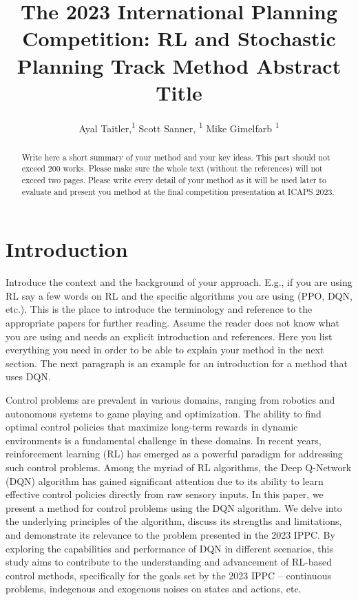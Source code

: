 \documentclass[letterpaper]{article} %
\title{The 2023 International Planning Competition: RL and Stochastic Planning Track Method Abstract Title}
\author {
    Ayal Taitler,\textsuperscript{\rm 1}
    Scott Sanner, \textsuperscript{\rm 1}
    Mike Gimelfarb \textsuperscript{\rm 1}
}
\begin{document}
\maketitle

\begin{abstract}
Write here a short summary of your method and your key ideas. This part should not exceed 200 works. Please make sure the whole text (without the references) will not exceed two pages. Please write every detail of your method as it will be used later to evaluate and present you method at the final competition presentation at ICAPS 2023.
\end{abstract}

\section{Introduction}
Introduce the context and the background of your approach. E.g., if you are using RL say a few words on RL and the specific algorithms you are using (PPO, DQN, etc.). This is the place to introduce the terminology and reference to the appropriate papers for further reading. Assume the reader does not know what you are using and needs an explicit introduction and references. Here you list everything you need in order to be able to explain your method in the next section. The next paragraph is an example for an introduction for a method that uses DQN.

Control problems are prevalent in various domains, ranging from robotics and autonomous systems to game playing and optimization. The ability to find optimal control policies that maximize long-term rewards in dynamic environments is a fundamental challenge in these domains. In recent years, reinforcement learning (RL) has emerged as a powerful paradigm for addressing such control problems. Among the myriad of RL algorithms, the Deep Q-Network (DQN) \cite{mnih2013playing} algorithm has gained significant attention due to its ability to learn effective control policies directly from raw sensory inputs. In this paper, we present a method for control problems using the DQN algorithm. We delve into the underlying principles of the algorithm, discuss its strengths and limitations, and demonstrate its relevance to the problem presented in the 2023 IPPC. By exploring the capabilities and performance of DQN in different scenarios, this study aims to contribute to the understanding and advancement of RL-based control methods, specifically for the goals set by the 2023 IPPC -- continuous problems, indegenous and exogenous noises on states and actions, etc.
\end{document}
